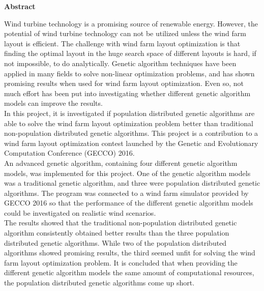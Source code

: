 \begin{center}
\textbf{Abstract}
\end{center}    

\noindent Wind turbine technology is a promising source of renewable energy. However, the potential of wind turbine technology can not be utilized unless the wind farm layout is efficient. The challenge with wind farm layout optimization is that finding the optimal layout in the huge search space of different layouts is hard, if not impossible, to do analytically. Genetic algorithm techniques have been applied in many fields to solve non-linear optimization problems, and has shown promising results when used for wind farm layout optimization. Even so, not much effort has been put into investigating whether different genetic algorithm models can improve the results.\\

\noindent In this project, it is investigated if population distributed genetic algorithms are able to solve the wind farm layout optimization problem better than traditional non-population distributed genetic algorithms. This project is a contribution to a wind farm layout optimization contest launched by the Genetic and Evolutionary Computation Conference (GECCO) 2016.\\

\noindent An advanced genetic algorithm, containing four different genetic algorithm models, was implemented for this project. One of the genetic algorithm models was a traditional genetic algorithm, and three were population distributed genetic algorithms. The program was connected to a wind farm simulator provided by GECCO 2016 so that the performance of the different genetic algorithm models could be investigated on realistic wind scenarios.\\

\noindent The results showed that the traditional non-population distributed genetic algorithm consistently obtained better results than the three population distributed genetic algorithms. While two of the population distributed algorithms showed promising results, the third seemed unfit for solving the wind farm layout optimization problem. It is concluded that when providing the different genetic algorithm models the same amount of computational resources, the population distributed genetic algorithms come up short.\\
 
 \newpage